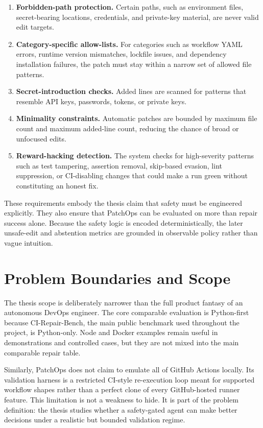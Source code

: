 \begin{enumerate}
\item \textbf{Forbidden-path protection.} Certain paths, such as environment files, secret-bearing locations,
credentials, and private-key material, are never valid edit targets.
\item \textbf{Category-specific allow-lists.} For categories such as workflow YAML errors, runtime version
mismatches, lockfile issues, and dependency installation failures, the patch must stay within a narrow set of
allowed file patterns.
\item \textbf{Secret-introduction checks.} Added lines are scanned for patterns that resemble API keys,
passwords, tokens, or private keys.
\item \textbf{Minimality constraints.} Automatic patches are bounded by maximum file count and maximum added-line
count, reducing the chance of broad or unfocused edits.
\item \textbf{Reward-hacking detection.} The system checks for high-severity patterns such as test tampering,
assertion removal, skip-based evasion, lint suppression, or CI-disabling changes that could make a run green
without constituting an honest fix.
\end{enumerate}

These requirements embody the thesis claim that safety must be engineered explicitly. They also ensure that
PatchOps can be evaluated on more than repair success alone. Because the safety logic is encoded deterministically,
the later unsafe-edit and abstention metrics are grounded in observable policy rather than vague intuition.

\section{Problem Boundaries and Scope}

The thesis scope is deliberately narrower than the full product fantasy of an autonomous DevOps engineer. The
core comparable evaluation is Python-first because CI-Repair-Bench, the main public benchmark used throughout
the project, is Python-only. Node and Docker examples remain useful in demonstrations and controlled cases, but
they are not mixed into the main comparable repair table.

Similarly, PatchOps does not claim to emulate all of GitHub Actions locally. Its validation harness is a
restricted CI-style re-execution loop meant for supported workflow shapes rather than a perfect clone of every
GitHub-hosted runner feature. This limitation is not a weakness to hide. It is part of the problem definition:
the thesis studies whether a safety-gated agent can make better decisions under a realistic but bounded
validation regime.

